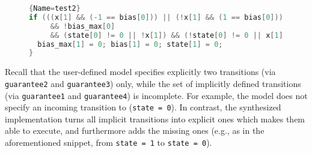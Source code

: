 \begin{figure}[h]
\vspace{-2em}
\begin{lstlisting}[language=C]{Name=test2}
if (((x[1] && (-1 == bias[0])) || (!x[1] && (1 == bias[0])))
     && !bias_max[0] 
     && (state[0] != 0 || !x[1]) && (!state[0] != 0 || x[1])) {
  bias_max[1] = 0; bias[1] = 0; state[1] = 0;
}
\end{lstlisting}%
\vspace{-2em}
\end{figure}%


Recall that the user-defined model specifies explicitly two transitions (via \texttt{guarantee2} and \texttt{guarantee3}) only, while the set of implicitly defined transitions (via \texttt{guarantee1} and \texttt{guarantee4}) is incomplete.
For example, the model does not specify an incoming transition to (\texttt{state = 0}).
In contrast, the synthesized implementation turns all implicit transitions into explicit ones which makes them able to execute, and furthermore adds the missing ones (e.g., as in the aforementioned snippet, from \texttt{state = 1} to \texttt{state = 0}).

